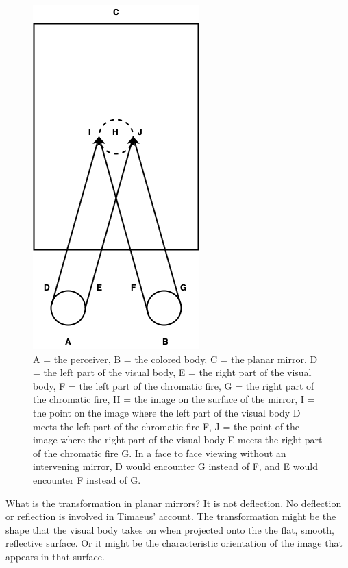 \begin{figure}[htbp]
	\centering
		\includegraphics[scale=0.4]{graphics/transform.png}
	\caption{A = the perceiver, B = the colored body, C = the planar mirror, D = the left part of the visual body, E = the right part of the visual body, F = the left part of the chromatic fire, G = the right part of the chromatic fire, H = the image on the surface of the mirror, I = the point on the image where the left part of the visual body D meets the left part of the chromatic fire F, J = the point of the image where the right part of the visual body E meets the right part of the chromatic fire G. In a face to face viewing without an intervening mirror, D would encounter G instead of F, and E would encounter F instead of G.}
	\label{fig:transform}
\end{figure}

What is the transformation in planar mirrors? It is not deflection. No deflection or reflection is involved in Timaeus' account. The transformation might be the shape that the visual body takes on when projected onto the the flat, smooth, reflective surface. Or it might be the characteristic orientation of the image that appears in that surface.

